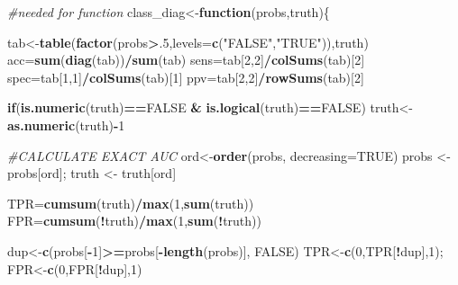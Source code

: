 \documentclass[]{article}
\newenvironment{Shaded}{\begin{snugshade}}{\end{snugshade}}
\newcommand{\CommentTok}[1]{\textcolor[rgb]{0.56,0.35,0.01}{\textit{#1}}}
\newcommand{\ControlFlowTok}[1]{\textcolor[rgb]{0.13,0.29,0.53}{\textbf{#1}}}
\newcommand{\DataTypeTok}[1]{\textcolor[rgb]{0.13,0.29,0.53}{#1}}
\newcommand{\DecValTok}[1]{\textcolor[rgb]{0.00,0.00,0.81}{#1}}
\newcommand{\KeywordTok}[1]{\textcolor[rgb]{0.13,0.29,0.53}{\textbf{#1}}}
\newcommand{\NormalTok}[1]{#1}
\newcommand{\OperatorTok}[1]{\textcolor[rgb]{0.81,0.36,0.00}{\textbf{#1}}}
\newcommand{\OtherTok}[1]{\textcolor[rgb]{0.56,0.35,0.01}{#1}}
\newcommand{\StringTok}[1]{\textcolor[rgb]{0.31,0.60,0.02}{#1}}
\begin{document}
\begin{Shaded}
\begin{Highlighting}[]
\CommentTok{#needed for function}
\NormalTok{class_diag<-}\ControlFlowTok{function}\NormalTok{(probs,truth)\{}
  
\NormalTok{  tab<-}\KeywordTok{table}\NormalTok{(}\KeywordTok{factor}\NormalTok{(probs}\OperatorTok{>}\NormalTok{.}\DecValTok{5}\NormalTok{,}\DataTypeTok{levels=}\KeywordTok{c}\NormalTok{(}\StringTok{"FALSE"}\NormalTok{,}\StringTok{"TRUE"}\NormalTok{)),truth)}
\NormalTok{  acc=}\KeywordTok{sum}\NormalTok{(}\KeywordTok{diag}\NormalTok{(tab))}\OperatorTok{/}\KeywordTok{sum}\NormalTok{(tab)}
\NormalTok{  sens=tab[}\DecValTok{2}\NormalTok{,}\DecValTok{2}\NormalTok{]}\OperatorTok{/}\KeywordTok{colSums}\NormalTok{(tab)[}\DecValTok{2}\NormalTok{]}
\NormalTok{  spec=tab[}\DecValTok{1}\NormalTok{,}\DecValTok{1}\NormalTok{]}\OperatorTok{/}\KeywordTok{colSums}\NormalTok{(tab)[}\DecValTok{1}\NormalTok{]}
\NormalTok{  ppv=tab[}\DecValTok{2}\NormalTok{,}\DecValTok{2}\NormalTok{]}\OperatorTok{/}\KeywordTok{rowSums}\NormalTok{(tab)[}\DecValTok{2}\NormalTok{]}

  \ControlFlowTok{if}\NormalTok{(}\KeywordTok{is.numeric}\NormalTok{(truth)}\OperatorTok{==}\OtherTok{FALSE} \OperatorTok{&}\StringTok{ }\KeywordTok{is.logical}\NormalTok{(truth)}\OperatorTok{==}\OtherTok{FALSE}\NormalTok{) truth<-}\KeywordTok{as.numeric}\NormalTok{(truth)}\OperatorTok{-}\DecValTok{1}
  
  \CommentTok{#CALCULATE EXACT AUC}
\NormalTok{  ord<-}\KeywordTok{order}\NormalTok{(probs, }\DataTypeTok{decreasing=}\OtherTok{TRUE}\NormalTok{)}
\NormalTok{  probs <-}\StringTok{ }\NormalTok{probs[ord]; truth <-}\StringTok{ }\NormalTok{truth[ord]}
  
\NormalTok{  TPR=}\KeywordTok{cumsum}\NormalTok{(truth)}\OperatorTok{/}\KeywordTok{max}\NormalTok{(}\DecValTok{1}\NormalTok{,}\KeywordTok{sum}\NormalTok{(truth)) }
\NormalTok{  FPR=}\KeywordTok{cumsum}\NormalTok{(}\OperatorTok{!}\NormalTok{truth)}\OperatorTok{/}\KeywordTok{max}\NormalTok{(}\DecValTok{1}\NormalTok{,}\KeywordTok{sum}\NormalTok{(}\OperatorTok{!}\NormalTok{truth))}
  
\NormalTok{  dup<-}\KeywordTok{c}\NormalTok{(probs[}\OperatorTok{-}\DecValTok{1}\NormalTok{]}\OperatorTok{>=}\NormalTok{probs[}\OperatorTok{-}\KeywordTok{length}\NormalTok{(probs)], }\OtherTok{FALSE}\NormalTok{)}
\NormalTok{  TPR<-}\KeywordTok{c}\NormalTok{(}\DecValTok{0}\NormalTok{,TPR[}\OperatorTok{!}\NormalTok{dup],}\DecValTok{1}\NormalTok{); FPR<-}\KeywordTok{c}\NormalTok{(}\DecValTok{0}\NormalTok{,FPR[}\OperatorTok{!}\NormalTok{dup],}\DecValTok{1}\NormalTok{)}
  

\end{Highlighting}
\end{Shaded}
\end{document}
